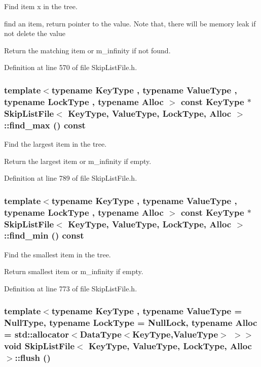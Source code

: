 Find item x in the tree. 

find an item, return pointer to the value. Note that, there will be memory leak if not delete the value

Return the matching item or m\_\-infinity if not found. 

Definition at line 570 of file SkipListFile.h.\hypertarget{classSkipListFile_4400eb10cd0d694545abd633cb4fb3cd}{
\subsubsection[{find\_\-max}]{\setlength{\rightskip}{0pt plus 5cm}template$<$typename KeyType , typename ValueType , typename LockType , typename Alloc $>$ const KeyType $\ast$ {\bf SkipListFile}$<$ KeyType, ValueType, LockType, Alloc $>$::find\_\-max () const}}
\label{classSkipListFile_4400eb10cd0d694545abd633cb4fb3cd}


Find the largest item in the tree. 

Return the largest item or m\_\-infinity if empty. 

Definition at line 789 of file SkipListFile.h.\hypertarget{classSkipListFile_f754d414aa41d527e0544a5aae83e9a3}{
\subsubsection[{find\_\-min}]{\setlength{\rightskip}{0pt plus 5cm}template$<$typename KeyType , typename ValueType , typename LockType , typename Alloc $>$ const KeyType $\ast$ {\bf SkipListFile}$<$ KeyType, ValueType, LockType, Alloc $>$::find\_\-min () const}}
\label{classSkipListFile_f754d414aa41d527e0544a5aae83e9a3}


Find the smallest item in the tree. 

Return smallest item or m\_\-infinity if empty. 

Definition at line 773 of file SkipListFile.h.\hypertarget{classSkipListFile_7f6eb737975a52483087a649ecced807}{
\subsubsection[{flush}]{\setlength{\rightskip}{0pt plus 5cm}template$<$typename KeyType , typename ValueType  = NullType, typename LockType  = NullLock, typename Alloc  = std::allocator$<$DataType$<$KeyType,ValueType$>$ $>$$>$ void {\bf SkipListFile}$<$ KeyType, ValueType, LockType, Alloc $>$::flush ()}}
\label{classSkipListFile_7f6eb737975a52483087a649ecced807}


